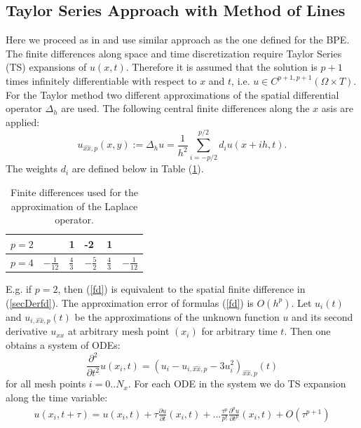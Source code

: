 \documentclass[%
 aip,
cp,  
 amsmath,amssymb,
 reprint,
]{iopconfser}
\newcommand{\be}{\begin{equation}}
\newcommand{\ee}{\end{equation}}
\newcommand{\rf}[1]{(\ref{#1})}
\begin{document}
\subsection{ Taylor Series Approach with Method of Lines}
Here we proceed as in \cite{refHyp} and use similar approach as the one defined for the BPE.
The finite differences along space and time discretization require Taylor Series (TS) expansions of $u(x,t)$. Therefore it is assumed that the solution is $p+1$ times infinitely differentiable with respect to $x$ and $t$, i.e. $u \in C^{p+1,p+1}(\Omega \times T)$.
For the Taylor method two different approximations of the spatial differential operator $\Delta_h$ are used. The following central finite differences along the $x$ asis are applied:
\begin{equation}\label{fd}
u_{\widehat{xx},p}(x,y) :=  \Delta_h u  = \frac{1}{h^2} \sum\limits_{i=-p/2}^{p/2} d_i u(x+ih, t).
\end{equation}
The weights $d_i$ are defined below in Table \rf{table:A00}.
\begin{table}[ht]
\centering
\small
		\begin{tabular}{|c|l|l|l|l|l|}

			\hline
            $p=2$          &                                           &     1      &   -2   &    1       &     \\
   			\hline 
           $p=4$          &                              $-\frac{1}{12}$     &     $\frac{4}{3}$      &   $-\frac{5}{2} $     &    $\frac{4}{3}$    &  $-\frac{1}{12}$      \\ 
	   \hline
		\end{tabular}
	\caption{ Finite differences used for the approximation of the Laplace operator.}
	\label{table:A00}
\end{table}
E.g. if $p=2$, then \rf{fd} is equivalent to the spatial finite difference in \rf{secDerfd}.  The approximation error of formulas \rf{fd} is $O(h^p)$. Let $u_{i}(t)$ and $u_{i, \widehat{xx}, p}(t)$ be the approximations of the unknown function $u$ and its second derivative $u_{xx}$ at arbitrary mesh point $(x_i)$ for arbitrary time $t$. Then one obtains a system of ODEs:
\be \label{DiscreteEq}
\frac{\partial^2 }{\partial t^2}u(x_i, t) =
(u_{i} - u_{i, \widehat{xx}, p} - 3u^2_{i})_{\widehat{xx}, p}(t) 
\ee
for all mesh points $i = 0..N_x$. For each ODE in the system we do TS expansion along the time variable:
\begin{align} \label{TSe}
u(x_i, t+\tau) = u(x_i, t) + \tau \frac{ \partial u }{ \partial t }(x_i,t)  + ... 
\frac{ \tau^p }{ p! } \frac{ \partial^p u }{ \partial t^p }(x_i, t) + O(\tau^{p+1})
\end{align}
\end{document}
